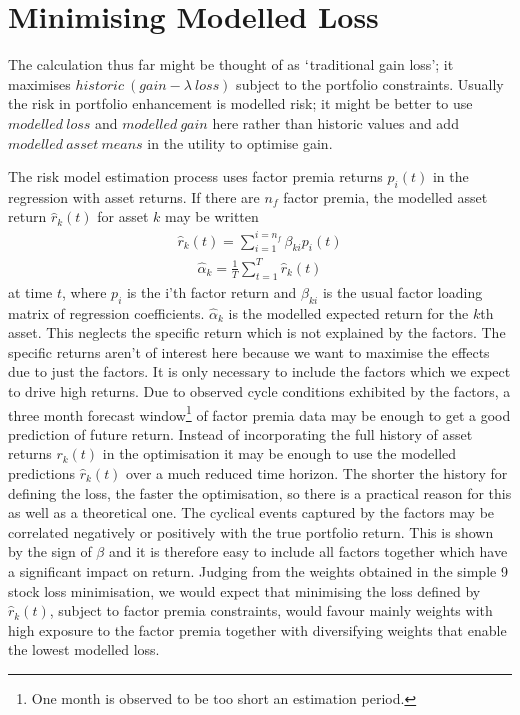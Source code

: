 \documentclass[12pt]{article}
\begin{document}
\section{Minimising Modelled Loss}
The calculation thus far might be thought of as $`$traditional gain loss'; it
maximises $historic\ (gain-\lambda\ loss)$ subject to the portfolio constraints. Usually the risk in 
portfolio enhancement is modelled risk; it might be better to use $modelled\ loss$ and $modelled\ gain$ here rather than historic values 
and add $modelled\ asset\ means$
in the utility to optimise gain.

The risk model estimation process uses factor premia returns $p_{i}(t)$ in the regression
with asset returns. If there are $n_f$ factor premia, the modelled asset return $\hat{r}_{k}(t)$ for asset $k$ may be written
\begin{eqnarray}
    \hat{r}_{k}(t) = \sum_{i=1}^{i=n_f}\beta_{ki} p_{i}(t)
\end{eqnarray}
\begin{eqnarray}
    \hat{\alpha}_k = \frac{1}{T}\sum_{t=1}^T \hat{r}_{k}(t)
\end{eqnarray}
at time $t$, where $p_i$ is the i'th factor return and $\beta_{ki}$ is the usual factor loading matrix of regression coefficients.
$\hat{\alpha}_k$ is the modelled expected return for the $k$th asset.
This neglects the specific return which is not explained by the factors. The specific returns aren't of interest here because we want 
to maximise the effects due to just the factors. It is only necessary to include the factors which we expect 
to drive high returns.
Due to observed cycle conditions exhibited by the factors, a three month forecast window\footnote{One month is observed to be too short an estimation period.} of factor premia data may be enough
to get a good prediction of future return. Instead of incorporating the full history of
asset returns $r_k(t)$ in the optimisation it may be enough to use the modelled predictions
$\hat{r}_{k}(t)$ over a much reduced time horizon. The shorter the history for defining the
loss, the faster the optimisation, so there is a practical reason for this as well as
a theoretical one. The cyclical events captured by the factors may be correlated negatively or positively with 
the true portfolio return. This is shown by the sign of $\beta$ and it is therefore easy to include all factors together 
which have a significant impact on return.
Judging from the weights obtained in the simple 9 stock loss minimisation, we would expect 
that minimising the loss defined by $\hat{r}_{k}(t)$, subject to factor premia constraints, would favour mainly weights 
with high exposure to the factor premia together with diversifying weights that enable the lowest modelled loss.
\end{document}
